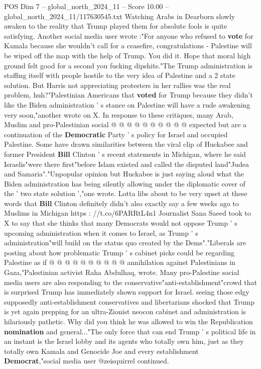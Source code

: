 \begin{textsample}{POS Dim 7 – global\_north\_2024\_11 – Score 10.00 – global\_north\_2024\_11/117630545.txt}
Watching Arabs in Dearborn slowly awaken to the reality that Trump played them for absolute fools is quite satisfying.
Another social media user wrote :"For anyone who refused to \textbf{vote} for Kamala because she wouldn't call for a ceasefire, congratulations - Palestine will be wiped off the map with the help of Trump.
You did it.
Hope that moral high ground felt good for a second you fucking dipshits."The Trump administration is staffing itself with people hostile to the very idea of Palestine and a 2 state solution.
But Harris not appreciating protesters in her rallies was the real problem, huh?"Palestinian Americans that \textbf{voted} for Trump because they didn't like the Biden administration ' s stance on Palestine will have a rude awakening very soon,"another wrote on X.
In response to these critiques, many Arab, Muslim and pro-Palestinian social @ @ @ @ @ @ @ @ @ @ expected but are a continuation of the \textbf{Democratic} Party ' s policy for Israel and occupied Palestine.
Some have drawn similarities between the viral clip of Huckabee and former President \textbf{Bill} Clinton ' s recent statements in Michigan, where he said Israelis"were there first"before Islam existed and called the disputed land"Judea and Samaria"."Unpopular opinion but Huckabee is just saying aloud what the Biden administration has being silently allowing under the diplomatic cover of the ' two state solution ',"one wrote.
Lotta libs about to be very upset at these words that \textbf{Bill} Clinton definitely didn't also exactly say a few weeks ago to Muslims in Michigan https : //t.co/6PARRtL4n1 Journalist Sana Saeed took to X to say that she thinks that many Democrats would not oppose Trump ' s upcoming administration when it comes to Israel, as Trump ' s administration"will build on the status quo created by the Dems"."Liberals are posting about how problematic Trump ' s cabinet picks could be regarding Palestine as if @ @ @ @ @ @ @ @ @ @ annihilation against Palestinians in Gaza,"Palestinian activist Raha Abdulhaq, wrote.
Many pro-Palestine social media users are also responding to the conservative"anti-establishment"crowd that is surprised Trump has immediately shown support for Israel. seeing those edgy supposedly anti-establishment conservatives and libertarians shocked that Trump is yet again prepping for an ultra-Zionist neocon cabinet and administration is hilariously pathetic.
Why did you think he was allowed to win the Republication \textbf{nomination} and general..."The only force that can end Trump ' s political life in an instant is the Israel lobby and its agents who totally own him, just as they totally own Kamala and Genocide Joe and every establishment \textbf{Democrat},"social media user @zeisquirrel continued.

\end{textsample}
